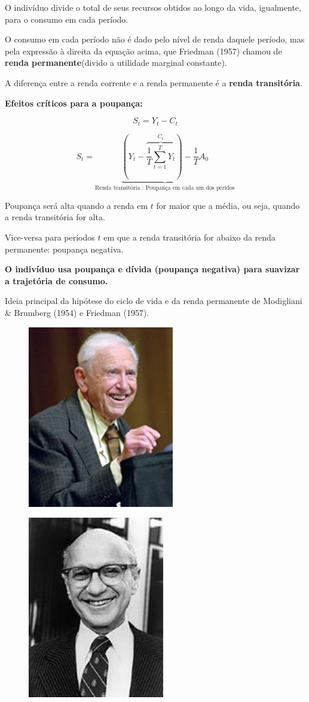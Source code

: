 \documentclass[a4paper,12pt]{article}[abntex2]
\begin{document}
O indivíduo divide o total de seus recursos obtidos ao longo da vida, igualmente, para o consumo em cada período.

O consumo em cada período não é dado pelo nível de renda daquele período, mas pela expressão à direita da equação acima, que Friedman (1957) chamou de \textbf{renda permanente}(divido a utilidade marginal constante).

A diferença entre a renda corrente e a renda permanente é a \textbf{renda transitória}.

\textbf{Efeitos críticos para a poupança:}

\[
S_t = Y_t - C_t
\]

\[
S_t = \underbrace{\left( Y_t - \overbrace{\frac{1}{T} \sum_{t=1}^{T} Y_t}^{C_t} \right) - \frac{1}{T} A_0}_\text{Renda transitória : Poupança em cada um dos perídos} 
\]

Poupança será alta quando a renda em \( t \) for maior que a média, ou seja, quando a renda transitória for alta.

Vice-versa para períodos \( t \) em que a renda transitória for abaixo da renda permanente: poupança negativa.

\textbf{O indivíduo usa poupança e dívida (poupança negativa) para suavizar a trajetória de consumo.}

Ideia principal da hipótese do ciclo de vida e da renda permanente de Modigliani \& Brumberg (1954) e Friedman (1957). 

\begin{figure}[H]
    \centering
    \includegraphics[width=0.25\linewidth]{Imagens/a16i3.png}
\end{figure}
\begin{figure}[H]
    \centering
    \includegraphics[width=0.25\linewidth]{Imagens/a16i4.png}
\end{figure}
\end{document}
